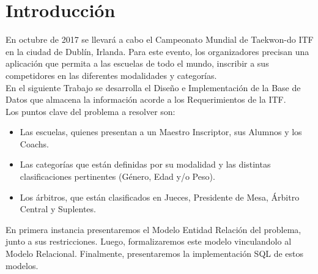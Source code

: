 \section{Introducci\'on}

En octubre de 2017 se llevará a cabo el Campeonato Mundial de Taekwon-do ITF en la ciudad de Dublín, Irlanda. Para este evento, los organizadores precisan una aplicación que permita a las escuelas de todo el mundo, inscribir a sus competidores en las diferentes modalidades y categorías.\\

En el siguiente Trabajo se desarrolla el Dise\~no e Implementaci\'on de la Base de Datos que almacena la informaci\'on acorde a los Requerimientos de la ITF.\\

Los puntos clave del problema a resolver son:
\begin{itemize}
\item Las escuelas, quienes presentan a un Maestro Inscriptor, sus Alumnos y los Coachs.
\item Las categor\'ias que est\'an definidas por su modalidad y las distintas clasificaciones pertinentes (G\'enero, Edad y/o Peso).
\item Los \'arbitros, que est\'an clasificados en Jueces, Presidente de Mesa, \'Arbitro Central y Suplentes.
\end{itemize}

En primera instancia presentaremos el Modelo Entidad Relación del problema, junto a sus restricciones. Luego, formalizaremos este modelo vinculandolo al Modelo Relacional. Finalmente, presentaremos la implementación SQL de estos modelos.